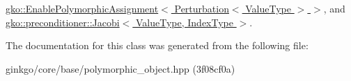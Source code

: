 \hyperlink{classgko_1_1EnablePolymorphicAssignment_a0a4cf244139e7761d6a91c61e029810e}{gko\+::\+Enable\+Polymorphic\+Assignment$<$ Perturbation$<$ Value\+Type $>$ $>$}, and \hyperlink{classgko_1_1preconditioner_1_1Jacobi_a6d5e28b3033772bfc6c96fbe3caca003}{gko\+::preconditioner\+::\+Jacobi$<$ Value\+Type, Index\+Type $>$}.



The documentation for this class was generated from the following file\+:\begin{DoxyCompactItemize}
\item 
ginkgo/core/base/polymorphic\+\_\+object.\+hpp (3f08cf0a)\end{DoxyCompactItemize}
